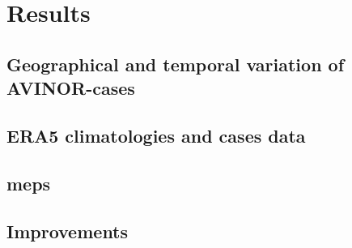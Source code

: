 \chapter{Results}
\section{Geographical and temporal variation of AVINOR-cases}

\section{ERA5 climatologies and cases data}

\section{\acrfull{meps}}

\section{Improvements}